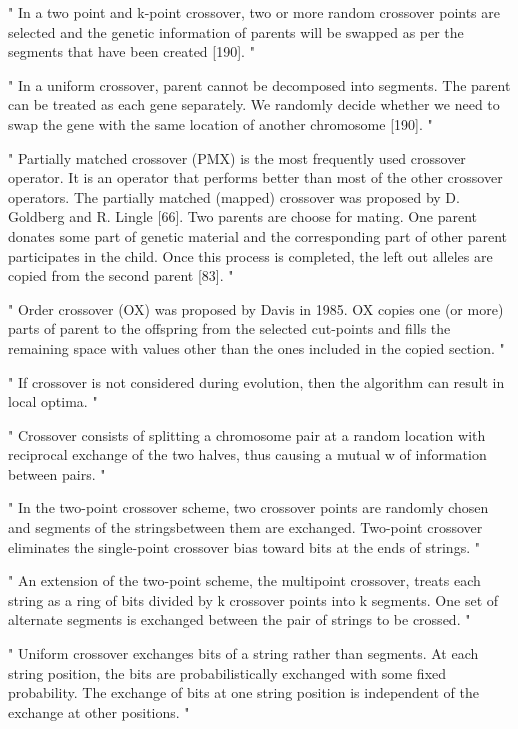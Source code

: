 "
In a two point and k-point crossover, two or more random crossover points are selected and the genetic information of parents will be swapped as per the segments that have been created [190].
"\cite{katoch_review_2021}

"
In a uniform crossover, parent cannot be decomposed into segments. The parent can be treated as each gene separately. We randomly decide whether we need to swap the gene with the same location of another chromosome [190].
"\cite{katoch_review_2021}


"
Partially matched crossover (PMX) is the most frequently used crossover operator. It is an operator that performs better than most of the other crossover operators. The partially matched (mapped) crossover was proposed by D. Goldberg and R. Lingle [66]. Two parents are choose for mating. One parent donates some part of genetic material and the corresponding part of other parent participates in the child. Once this process is completed, the left out alleles are copied from the second parent [83].
"\cite{katoch_review_2021}


"
Order crossover (OX) was proposed by Davis in 1985. OX copies one (or more) parts of parent to the offspring from the selected cut-points and fills the remaining space with values other than the ones included in the copied section.
"\cite{katoch_review_2021}

"
If crossover is not considered during evolution, then the algorithm can result in local optima.
"\cite{katoch_review_2021}

"
Crossover consists of splitting a chromosome pair at a random location with reciprocal exchange of the two halves, thus causing a mutual w of information between pairs.
"\cite{marsili_libelli_adaptive_2000}

"
In the two-point crossover scheme, two crossover points are randomly chosen and segments of the stringsbetween them are exchanged. Two-point crossover eliminates the single-point crossover bias toward bits at the ends of strings.
"\cite{srinivas_genetic_1994}

"
An extension of the two-point scheme, the multipoint crossover, treats each string as a ring of bits divided by k crossover points into k segments. One set of alternate segments is exchanged between the pair of strings to be crossed.
"\cite{srinivas_genetic_1994}

"
Uniform crossover exchanges bits of a string rather than segments. At each string position, the bits are probabilistically exchanged with some fixed probability. The exchange of bits at one string position is independent of the exchange at other positions.
"\cite{srinivas_genetic_1994}

